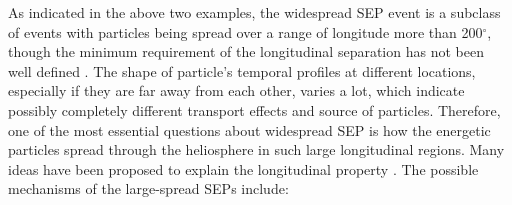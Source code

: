 As indicated in the above two examples, the widespread \ac{SEP} event is a subclass of events with particles being spread over a range of longitude more than 200$^\circ$, though the minimum requirement of the longitudinal separation has not been well defined \citep{Dresing_2014phd}. The shape of particle's temporal profiles at different locations, especially if they are far away from each other, varies a lot, which indicate possibly completely different transport effects and source of particles. 
Therefore, one of the most essential questions about widespread \ac{SEP} is how the energetic particles spread through the heliosphere in such large longitudinal regions. Many ideas have been proposed to explain the longitudinal property \citep{Richardson2014SoPh, Dresing2012SoPh,Desai_Diacalone2016LRSP, Reames2021LNP}. The possible mechanisms of the large-spread SEPs include:
